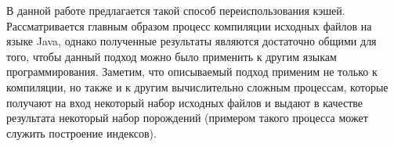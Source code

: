 В данной работе предлагается такой способ переиспользования кэшей. Рассматривается главным образом процесс компиляции исходных файлов на языке Java, однако полученные результаты являются достаточно общими для того, чтобы данный подход можно было применить к другим языкам программирования. Заметим, что описываемый подход применим не только к компиляции, но также и к другим вычислительно сложным процессам, которые получают на вход некоторый набор исходных файлов и выдают в качестве результата некоторый набор порождений (примером такого процесса может служить построение индексов).

%